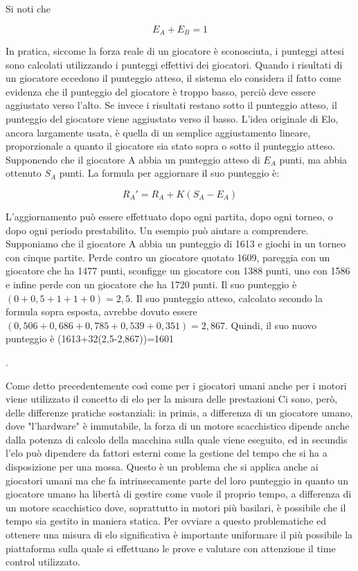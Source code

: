 Si noti che {\begin{equation}E_{A} +  E_{B}=1 \end{equation}

In pratica, siccome la forza reale di un giocatore è sconosciuta, i punteggi attesi sono calcolati utilizzando i punteggi effettivi dei giocatori. Quando i risultati di un giocatore eccedono il punteggio atteso,
il sistema elo considera il fatto come evidenza che il punteggio del giocatore è troppo basso, perciò deve essere aggiustato verso l'alto. Se invece i risultati restano sotto il punteggio atteso, 
il punteggio del giocatore viene aggiustato verso il basso. L'idea originale di Elo, ancora largamente usata, è quella di un semplice aggiustamento lineare, proporzionale a quanto il giocatore sia stato
sopra o sotto il punteggio atteso. 
Supponendo che il giocatore A abbia un punteggio atteso di ${E_{A}}$ punti, ma abbia ottenuto ${S_{A}}$ punti. La formula per aggiornare il suo punteggio è:

\begin{equation} R_{A}' =R_{A}+K(S_{A}-E_{A})\end{equation}

L'aggiornamento può essere effettuato dopo ogni partita, dopo ogni torneo, o dopo ogni periodo prestabilito. Un esempio può aiutare a comprendere. Supponiamo che il giocatore A abbia un punteggio di 1613 
e giochi in un torneo con cinque partite. Perde contro un giocatore quotato 1609, pareggia con un giocatore che ha 1477 punti, sconfigge un giocatore con 1388 punti, uno con 1586 e infine perde con un giocatore 
che ha 1720 punti. Il suo punteggio è $ {(0+0,5+1+1+0)=2,5}$. Il suo punteggio atteso, calcolato secondo la formula sopra esposta, avrebbe dovuto essere 
$ (0,506+0,686+0,785+0,539+0,351)=2,867 $. Quindi, il suo nuovo punteggio è (1613+32(2,5-2,867))=1601} \cite{itwiki:125247032}.

Come detto precedentemente così come per i giocatori umani anche per i motori viene utilizzato il concetto di elo per la misura delle prestazioni Ci sono, però, delle differenze pratiche sostanziali: in primis,
a differenza di un giocatore umano, dove "l'hardware" è immutabile, la forza di un motore scacchistico dipende anche dalla potenza di calcolo della macchina sulla quale viene eseguito, ed in secundis l'elo può dipendere 
da fattori esterni come la gestione del tempo che si ha a disposizione per una mossa. Questo è un problema che si applica anche ai giocatori umani ma che fa intrinsecamente parte del loro punteggio in quanto 
un giocatore umano ha libertà di gestire come vuole il proprio tempo, a differenza di un motore scacchistico dove, soprattutto in motori più basilari, è possibile che il tempo sia gestito in maniera statica.
Per ovviare a questo problematiche ed ottenere una misura di elo significativa è importante uniformare il più possibile la piattaforma sulla quale si effettuano le prove e valutare con attenzione il time control utilizzato.

